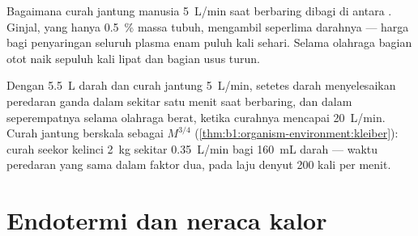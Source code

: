 \begin{omfigure}

{\small Bagaimana curah jantung manusia \qty{5}{L/min} saat berbaring
dibagi di antara . Ginjal, yang hanya \qty{0.5}{\%} massa tubuh,
mengambil seperlima darahnya --- harga bagi penyaringan seluruh plasma
enam puluh kali sehari. Selama olahraga bagian otot naik sepuluh kali
lipat dan bagian usus turun.}
\end{omfigure}

\begin{example}\label{ex:b1:mammal-organization:circtime}
Dengan \qty{5.5}{L} darah dan curah jantung \qty{5}{L/min}, setetes
darah menyelesaikan peredaran ganda dalam sekitar satu menit saat
berbaring, dan dalam seperempatnya selama olahraga berat, ketika
curahnya mencapai \qty{20}{L/min}. Curah jantung berskala sebagai
$M^{3/4}$ (\cref{thm:b1:organism-environment:kleiber}): curah seekor
kelinci \qty{2}{kg} sekitar \qty{0.35}{L/min} bagi \qty{160}{mL} darah
--- waktu peredaran yang sama dalam faktor dua, pada laju denyut
\qty{200}{} kali per menit.
\end{example}

\section{Endotermi dan neraca kalor}

